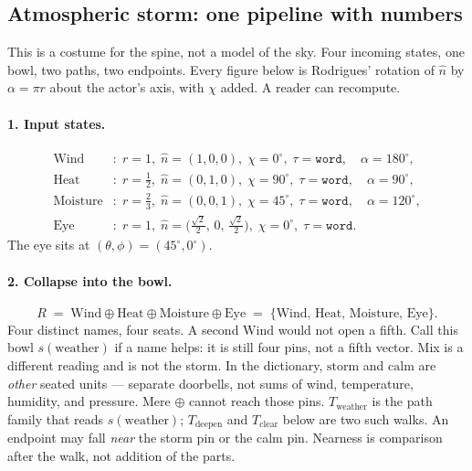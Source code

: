 \documentclass[12pt, a4paper]{article}
\begin{document}
\subsection{Atmospheric storm: one pipeline with numbers}
\label{subsec:storm_pipeline}
This is a costume for the spine, not a model of the sky. Four incoming
states, one bowl, two paths, two endpoints. Every figure below is
Rodrigues' rotation of $\hat n$ by $\alpha=\pi r$ about the actor's
axis, with $\chi$ added. A reader can recompute.

\paragraph{1. Input states.}
\begin{align*}
\mathrm{Wind}&:
  \; r=1,\;
  \hat n=(1,0,0),\;
  \chi=0^\circ,\;
  \tau=\mathtt{word},
  \quad \alpha=180^\circ,\\
\mathrm{Heat}&:
  \; r=\tfrac12,\;
  \hat n=(0,1,0),\;
  \chi=90^\circ,\;
  \tau=\mathtt{word},
  \quad \alpha=90^\circ,\\
\mathrm{Moisture}&:
  \; r=\tfrac23,\;
  \hat n=(0,0,1),\;
  \chi=45^\circ,\;
  \tau=\mathtt{word},
  \quad \alpha=120^\circ,\\
\mathrm{Eye}&:
  \; r=1,\;
  \hat n=\bigl(\tfrac{\sqrt{2}}{2},\,0,\,\tfrac{\sqrt{2}}{2}\bigr),\;
  \chi=0^\circ,\;
  \tau=\mathtt{word}.
\end{align*}
The eye sits at $(\theta,\phi)=(45^\circ,0^\circ)$.

\paragraph{2. Collapse into the bowl.}
\begin{equation}
    R
    \;=\;
    \mathrm{Wind}\oplus\mathrm{Heat}\oplus\mathrm{Moisture}\oplus\mathrm{Eye}
    \;=\;
    \{\mathrm{Wind},\,\mathrm{Heat},\,\mathrm{Moisture},\,\mathrm{Eye}\}.
    \label{eq:storm_bowl}
\end{equation}
Four distinct names, four seats. A second $\mathrm{Wind}$ would not
open a fifth. Call this bowl $s(\mathrm{weather})$ if a name helps:
it is still four pins, not a fifth vector. Mix is a different
reading and is not the storm.
In the dictionary, $\mathrm{storm}$ and $\mathrm{calm}$ are
\emph{other} seated units --- separate doorbells, not sums of
wind, temperature, humidity, and pressure. Mere $\oplus$ cannot
reach those pins. $T_{\mathrm{weather}}$ is the path family that
reads $s(\mathrm{weather})$; $T_{\mathrm{deepen}}$ and
$T_{\mathrm{clear}}$ below are two such walks. An endpoint may
fall \emph{near} the storm pin or the calm pin. Nearness is
comparison after the walk, not addition of the parts.
\end{document}
